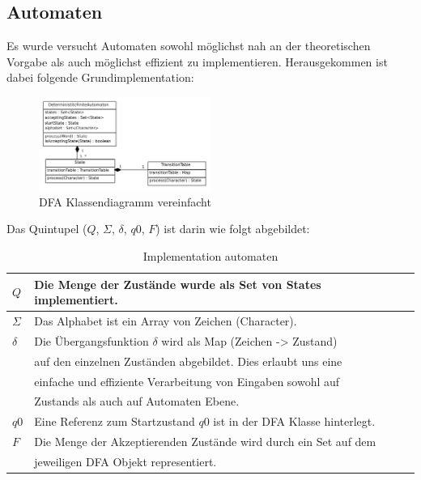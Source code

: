 \subsection{Automaten}
Es wurde versucht Automaten sowohl möglichst nah an der theoretischen Vorgabe als auch möglichst effizient zu implementieren. Herausgekommen ist dabei folgende Grundimplementation:
\begin{figure}[h]
  \centering
  \includegraphics[width=0.5\textwidth]{images/dfa_classdiag_simple.pdf}
  \caption[DFA Klassendiagramm vereinfacht]{DFA Klassendiagramm vereinfacht}
  \label{fig:dfa_classdiag_simple}
\end{figure}

Das Quintupel ($Q$, $\Sigma$, $\delta$, $q0$, $F$) ist darin wie folgt abgebildet:

\begin{table}[h]
  \centering
  \begin{tabular}{ l | l }
    \hline
    $Q$ & Die Menge der Zustände wurde als Set von States implementiert.  \\
    \hline
    $\Sigma$ & Das Alphabet ist ein Array von Zeichen (Character). \\
    \hline
    $\delta$ & Die Übergangsfunktion $\delta$ wird als Map (Zeichen -> Zustand) 
    \\ & auf den einzelnen Zuständen abgebildet. Dies erlaubt uns eine
    \\ & einfache und effiziente Verarbeitung von Eingaben sowohl auf
    \\ & Zustands als auch auf Automaten Ebene. \\
    \hline
    $q0$ & Eine Referenz zum Startzustand $q0$ ist in der DFA Klasse hinterlegt. \\
    \hline
    $F$ & Die Menge der Akzeptierenden Zustände wird durch ein Set auf dem \\ & jeweiligen DFA Objekt representiert. \\
    \hline 
  \end{tabular}
  \caption[Implementation Automaten]{Implementation automaten}
\end{table}

